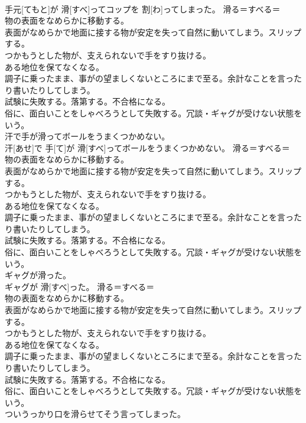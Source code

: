 \documentclass[8pt]{extreport}
\begin{document}
\begin{CJK}{UTF8}{min}
{\\	手元[てもと]が 滑[すべ]ってコップを 割[わ]ってしまった。	滑る＝すべる＝ 
\\	物の表面をなめらかに移動する。 
\\	表面がなめらかで地面に接する物が安定を失って自然に動いてしまう。スリップする。 
\\	つかもうとした物が、支えられないで手をすり抜ける。 
\\	ある地位を保てなくなる。 
\\	調子に乗ったまま、事がの望ましくないところにまで至る。余計なことを言ったり書いたりしてしまう。 
\\	試験に失敗する。落第する。不合格になる。 
\\	俗に、面白いことをしゃべろうとして失敗する。冗談・ギャグが受けない状態をいう。
\\	汗で手が滑ってボールをうまくつかめない。	
\\	汗[あせ]で 手[て]が 滑[すべ]ってボールをうまくつかめない。	滑る＝すべる＝ 
\\	物の表面をなめらかに移動する。 
\\	表面がなめらかで地面に接する物が安定を失って自然に動いてしまう。スリップする。 
\\	つかもうとした物が、支えられないで手をすり抜ける。 
\\	ある地位を保てなくなる。 
\\	調子に乗ったまま、事がの望ましくないところにまで至る。余計なことを言ったり書いたりしてしまう。 
\\	試験に失敗する。落第する。不合格になる。 
\\	俗に、面白いことをしゃべろうとして失敗する。冗談・ギャグが受けない状態をいう。
\\	ギャグが滑った。	
\\	ギャグが 滑[すべ]った。	滑る＝すべる＝ 
\\	物の表面をなめらかに移動する。 
\\	表面がなめらかで地面に接する物が安定を失って自然に動いてしまう。スリップする。 
\\	つかもうとした物が、支えられないで手をすり抜ける。 
\\	ある地位を保てなくなる。 
\\	調子に乗ったまま、事がの望ましくないところにまで至る。余計なことを言ったり書いたりしてしまう。 
\\	試験に失敗する。落第する。不合格になる。 
\\	俗に、面白いことをしゃべろうとして失敗する。冗談・ギャグが受けない状態をいう。
\\	ついうっかり口を滑らせてそう言ってしまった。	
}
\end{CJK}
\end{document}
